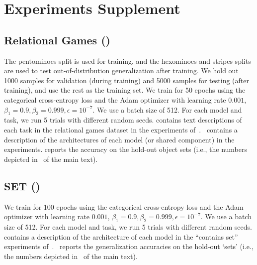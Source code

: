 \section{Experiments Supplement}\label{sec:experiments_supplement}

\subsection{Relational Games ()}

The pentominoes split is used for training,
and the hexominoes and stripes splits are used to test out-of-distribution generalization after training. We hold out 1000 samples for validation (during training) and 5000 samples for testing (after training), and use the rest as the training set. We train for 50 epochs using the categorical cross-entropy loss and the Adam optimizer with learning rate $0.001$, $\beta_1 = 0.9, \beta_2 = 0.999, \epsilon = 10^{-7}$. We use a batch size of 512. For each model and task, we run 5 trials with different random seeds. contains text descriptions of each task in the relational games dataset in the experiments of~.~ contains a description of the architectures of each model (or shared component) in the experiments.
 reports the accuracy on the hold-out object sets (i.e., the numbers depicted in~ of the main text).

\subsection{SET ()}

We train for 100 epochs using the categorical cross-entropy loss and the Adam optimizer with learning rate $0.001$, $\beta_1 = 0.9, \beta_2 = 0.999, \epsilon = 10^{-7}$. We use a batch size of 512. For each model and task, we run 5 trials with different random seeds. contains a description of the architecture of each model in the ``contains set'' experiments of~.~ reports the generalization accuracies on the hold-out `sets' (i.e., the numbers depicted in~ of the main text).


